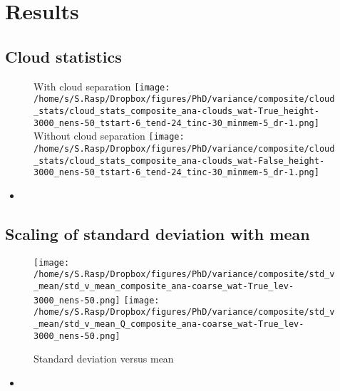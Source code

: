 \documentclass[a4paper, 12pt]{article}
\begin{document}
\newpage


\section{Results}

\subsection{Cloud statistics}
\begin{figure}[h!]
\noindent \centering
With cloud separation
\texttt{[image: /home/s/S.Rasp/Dropbox/figures/PhD/variance/composite/cloud\_stats/cloud\_stats\_composite\_ana-clouds\_wat-True\_height-3000\_nens-50\_tstart-6\_tend-24\_tinc-30\_minmem-5\_dr-1.png]}
Without cloud separation
\texttt{[image: /home/s/S.Rasp/Dropbox/figures/PhD/variance/composite/cloud\_stats/cloud\_stats\_composite\_ana-clouds\_wat-False\_height-3000\_nens-50\_tstart-6\_tend-24\_tinc-30\_minmem-5\_dr-1.png]}\\
\caption{} \label{fig:geographical}
\end{figure}
\begin{itemize}
 \item 
\end{itemize}

\newpage


\subsection{Scaling of standard deviation with mean}
\begin{figure}[h!]
\noindent \centering
\texttt{[image: /home/s/S.Rasp/Dropbox/figures/PhD/variance/composite/std\_v\_mean/std\_v\_mean\_composite\_ana-coarse\_wat-True\_lev-3000\_nens-50.png]}
\texttt{[image: /home/s/S.Rasp/Dropbox/figures/PhD/variance/composite/std\_v\_mean/std\_v\_mean\_Q\_composite\_ana-coarse\_wat-True\_lev-3000\_nens-50.png]}\\
\caption{Standard deviation versus mean} \label{fig:geographical}
\end{figure}
\begin{itemize}
 \item 
\end{itemize}

\newpage
\end{document}
